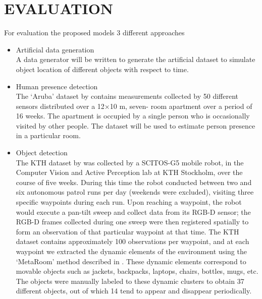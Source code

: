 \chapter{EVALUATION}


For evaluation the proposed models 3 different approaches 
\begin{itemize}
	\item Artificial data generation \\
	A data generator will be written to generate the artificial dataset to simulate object location of different objects with respect to time.
	\item Human presence detection \\
	The ‘Aruba’ dataset by \cite{cook2010learning} contains measurements collected by
50 different sensors distributed over a 12×10 m, seven-
room apartment over a period of 16 weeks. The apartment is
occupied by a single person who is occasionally visited by
other people. The dataset will be used to estimate person presence in a particular room.

	\item Object detection \\
	The KTH dataset by \cite {krajnik_life-long_2015} was collected
by a SCITOS-G5 mobile robot, in the Computer Vision and Active Perception lab at KTH Stockholm,
over the course of five weeks. During this time the robot
conducted between two and six autonomous patrol runs
per day (weekends were excluded), visiting three specific
waypoints during each run. Upon reaching a waypoint, the
robot would execute a pan-tilt sweep and collect data from
its RGB-D sensor; the RGB-D frames collected during one
sweep were then registered spatially to form an observation
of that particular waypoint at that time. The KTH dataset
contains approximately 100 observations per waypoint, and
at each waypoint we extracted the dynamic elements of
the environment using the ‘MetaRoom’ method described
in \cite{}. These dynamic elements correspond to movable objects
such as jackets, backpacks, laptops, chairs, bottles, mugs,
etc. The objects were manually
labeled to these dynamic clusters to obtain 37 different objects,
out of which 14 tend to appear and disappear periodically.

\end{itemize}
